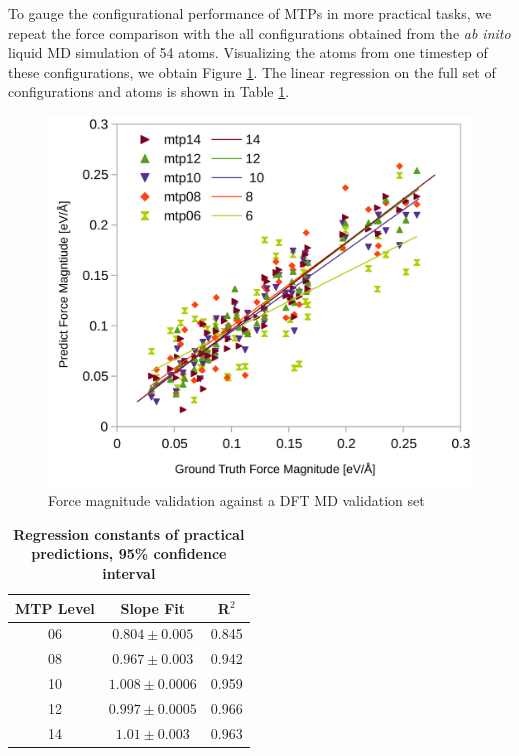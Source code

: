 \documentclass[9pt,twocolumn,twoside]{opticajnl}
\begin{document}
To gauge the configurational performance of MTPs in more practical tasks, we repeat the force comparison with the all configurations obtained from the \textit{ab inito} liquid MD simulation of 54 atoms. Visualizing the atoms from one timestep of these configurations, we obtain Figure \ref{fig:aimdconfigs}. The linear regression on the full set of configurations and atoms is shown in Table \ref{tab:aimdconfigs}.

\begin{figure}[ht]
  \centering
  \includegraphics[width=\linewidth]{assets/aimdconfigurations.png}
  \caption{Force magnitude validation against a DFT MD validation set}
  \label{fig:aimdconfigs}
\end{figure}

\begin{table}[htbp]
  \centering
  \caption{\bf Regression constants of practical predictions, 95\% confidence interval }
  \begin{tabular}{ccc}
  \hline
  MTP Level & Slope Fit &  R$^2$\\ 
  \hline
  06 & $0.804 \pm 0.005$ & 0.845 \\
  08 & $0.967 \pm 0.003$ & 0.942  \\
  10 & $1.008 \pm 0.0006$ & 0.959 \\
  12 & $0.997 \pm 0.0005$ & 0.966 \\
  14 & $1.01 \pm 0.003$ & 0.963 \\
  \hline
  \end{tabular}
  \label{tab:aimdconfigs}
\end{table}
\end{document}
